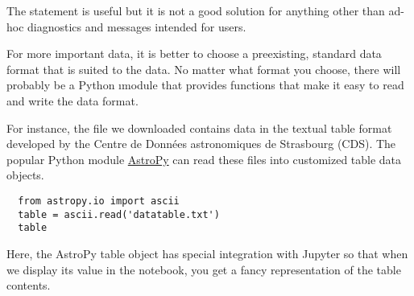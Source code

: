 \documentclass[letterpaper, 12pt, titlepage, twoside]{article}
\begin{document}
The  statement is useful but it is not a good solution for anything
other than ad-hoc diagnostics and messages intended for users.

For more important data, it is better to choose a preexisting, standard data
format that is suited to the data. No matter what format you choose, there
will probably be a Python \i{module} that provides functions that make it easy
to read and write the data format.

For instance, the file we downloaded contains data in the textual table format
developed by the Centre de Données astronomiques de Strasbourg (CDS). The
popular Python module \href{http://www.astropy.org/}{AstroPy} can read these
files into customized table data objects.

\begin{lstlisting}
  from astropy.io import ascii
  table = ascii.read('datatable.txt')
  table
\end{lstlisting}

Here, the AstroPy table object has special integration with Jupyter so that
when we display its value in the notebook, you get a fancy representation of
the table contents.
\end{document}
